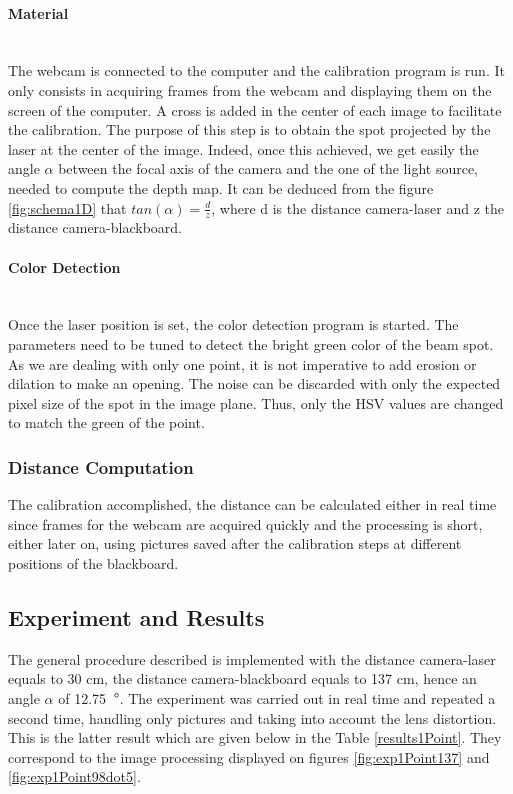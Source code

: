\paragraph*{Material}
~\\
The webcam is connected to the computer and the calibration program is run. It only consists in acquiring frames from the webcam and displaying them on the screen of the computer. A cross is added in the center of each image to facilitate the calibration. The purpose of this step is to obtain the spot projected by the laser at the center of the image. Indeed, once this achieved, we get easily the angle $\alpha$ between the focal axis of the camera and the one of the light source, needed to compute the depth map. It can be deduced from the figure \ref{fig:schema1D} that $tan(\alpha) = \frac{d}{z}$, where d is the distance camera-laser and z the distance camera-blackboard.

\paragraph*{Color Detection}
~\\
Once the laser position is set, the color detection program is started. The parameters need to be tuned to detect the bright green color of the beam spot. As we are dealing with only one point, it is not imperative to add erosion or dilation to make an opening. The noise can be discarded with only the expected pixel size of the spot in the image plane. Thus, only the HSV values are changed to match the green of the point.

\subsubsection{Distance Computation}
The calibration accomplished, the distance can be calculated either in real time since frames for the webcam are acquired quickly and the processing is short, either later on, using pictures saved after the calibration steps at different positions of the blackboard.

\subsection{Experiment and Results}
The general procedure described is implemented with the distance camera-laser equals to 30 cm, the distance camera-blackboard equals to 137 cm, hence an angle $\alpha$ of 12.75~$\degree$. The experiment was carried out in real time and repeated a second time, handling only pictures and taking into account the lens distortion. This is the latter result which are given below in the Table \ref{results1Point}. They correspond to the image processing displayed on figures \ref{fig:exp1Point137} and \ref{fig:exp1Point98dot5}.

